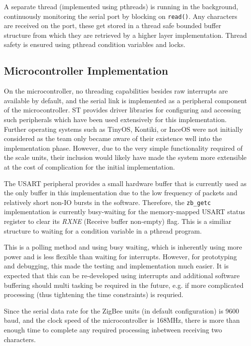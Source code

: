 A separate thread (implemented using pthreads) is running in the background, continuously monitoring the serial port by blocking on \texttt{read()}. Any characters are received on the port, these get stored in a thread safe bounded buffer structure from which they are retrieved by a higher layer implementation. Thread safety is ensured using pthread condition variables and locks.

\subsection{Microcontroller Implementation}
On the microcontroller, no threading capabilities besides raw interrupts are available by default, and the serial link is implemented as a peripheral component of the microcontroller. ST provides driver libraries for configuring and accessing such peripherals which have been used extensively for this implementation. Further operating systems such as TinyOS, Kontiki, or InceOS were not initially considered as the team only became aware of their existence well into the implementation phase. However, due to the very simple functionality required of the scale units, their inclusion would likely have made the system more extensible at the cost of complication for the initial implementation.

The USART peripheral provides a small hardware buffer that is currently used as the only buffer in this implementation due to the low frequency of packets and relatively short non-IO bursts in the software. Therefore, the \texttt{zb\_getc} implementation is currently busy-waiting for the memory-mapped USART status register to clear its \emph{RXNE} (Receive buffer non-empty) flag. This is a similiar structure to waiting for a condition variable in a pthread program. %

This is a polling method and using busy waiting, which is inherently using more power and is less flexible than waiting for interrupts. However, for prototyping and debugging, this made the testing and implementation much easier. It is expected that this can be re-developed using interrupts and additional software buffering should multi tasking be required in the future, e.g. if more complicated processing (thus tightening the time constraints) is requried.

Since the serial data rate for the ZigBee units (in default configuration) is 9600 baud, and the clock speed of the microcontroller is 168MHz, there is more than enough time to complete any required processing inbetween receiving two characters.

